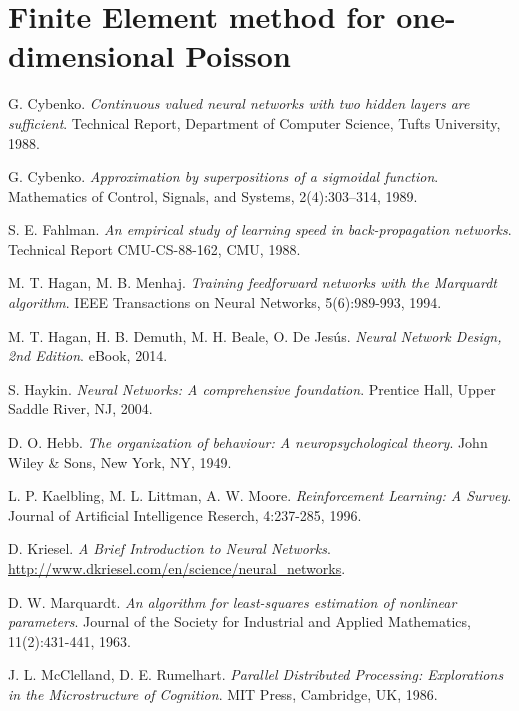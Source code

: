 \documentclass[11pt, a4paper]{report}
\numberwithin{equation}{chapter}
\theoremstyle{theorem}
\theoremstyle{definition}
\numberwithin{figure}{section}
\begin{document}
	\section{Finite Element method for one-dimensional Poisson}
	\label{section:Finite Element method for one-dimensional Poisson}
		
		
	\begin{thebibliography}{50}
	
		G. Cybenko. \emph{Continuous valued neural networks with two hidden layers are sufficient}. Technical Report, Department of Computer Science, Tufts University, 1988.
		
		G. Cybenko. \emph{Approximation by superpositions of a sigmoidal function}. Mathematics of Control, Signals, and Systems, 2(4):303–314, 1989.
		
		S. E. Fahlman. \emph{An empirical study of learning speed in back-propagation networks}. Technical Report CMU-CS-88-162, CMU, 1988.
		
		M. T. Hagan, M. B. Menhaj. \emph{Training feedforward networks with the Marquardt algorithm}. IEEE Transactions on Neural Networks, 5(6):989-993, 1994.
		
		M. T. Hagan, H. B. Demuth, M. H. Beale, O. De Jes\'us. \emph{Neural Network Design, 2nd Edition}. eBook, 2014.
		
		S. Haykin. \emph{Neural Networks: A comprehensive foundation}. Prentice Hall, Upper Saddle River, NJ, 2004.
		
		D. O. Hebb. \emph{The organization of behaviour: A neuropsychological theory}. John Wiley \& Sons, New York, NY, 1949. 
		
		L. P. Kaelbling, M. L. Littman, A. W. Moore. \emph{Reinforcement Learning: A Survey}. Journal of Artificial Intelligence Reserch, 4:237-285, 1996.
		
		D. Kriesel. \emph{A Brief Introduction to Neural Networks}. \url{http://www.dkriesel.com/en/science/neural_networks}.
		
		D. W. Marquardt. \emph{An algorithm for least-squares estimation of nonlinear parameters}. Journal of the Society for Industrial and Applied Mathematics, 11(2):431-441, 1963.
				
		J. L. McClelland, D. E. Rumelhart. \emph{Parallel Distributed Processing: Explorations in the Microstructure of Cognition}. MIT Press, Cambridge, UK, 1986.
		

\end{thebibliography}
\end{document}
